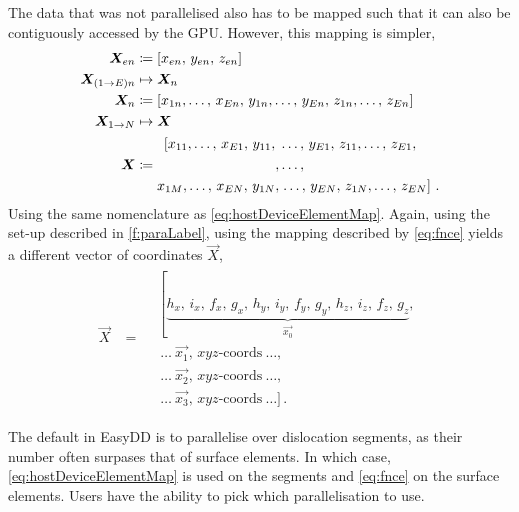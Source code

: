 The data that was not parallelised also has to be mapped such that it can also be contiguously accessed by the GPU. However, this mapping is simpler,
\begin{subequations}\label{eq:fnce}
  \begin{align}
    \vec{X}_{en}        & \coloneqq \left[x_{en},\, y_{en},\, z_{en}\right]                                                    \\
    \vec{X}_{(1\to E)n} & \mapsto \vec{X}_{n} \nn
    \vec{X}_{n}         & \coloneqq \left[x_{1n},\ldots,\, x_{En},\, y_{1n},\ldots,\, y_{En},\, z_{1n},\ldots,\, z_{En}\right] \\
    \vec{X}_{1\to N}    & \mapsto \vec{X}\nn
    \vec{X}             & \coloneqq
    \begin{aligned}
      \left[x_{11},\ldots,\, x_{E1},\, y_{11},\right. & \ldots,\, y_{E1},\, z_{11},\ldots,\, z_{E1},                \\
      ,                                               & \ldots,                                                     \\
      x_{1M},\ldots,\, x_{EN},\, y_{1N},              & \left.\ldots,\, y_{EN},\, z_{1N},\ldots,\, z_{EN}\right]\,.
    \end{aligned}
  \end{align}
\end{subequations}
Using the same nomenclature as \cref{eq:hostDeviceElementMap}. Again, using the set-up described in \cref{f:paraLabel}, using the mapping described by \cref{eq:fnce} yields a different vector of coordinates $\vec{X}$,
\begin{align}\label{eq:fnce_eg}
  \vec{X} & = \begin{aligned}
     & \left[\underbrace{h_{x},\, i_{x},\, f_{x},\, g_{x},\,
      h_{y},\, i_{y},\, f_{y},\, g_{y},\,
    h_{z},\, i_{z},\, f_{z},\, g_{z}}_{\vec{x_{0}}}\right.,  \\
     & ~\ldots~\vec{x_{1}},\, xyz\textrm{-coords}~\ldots,    \\
     & ~\ldots~\vec{x_{2}},\, xyz\textrm{-coords}~\ldots,    \\
     & ~\ldots~\vec{x_{3}},\, xyz\textrm{-coords}~\ldots]\,.
  \end{aligned}
\end{align}

The default in EasyDD is to parallelise over dislocation segments, as their number often surpases that of surface elements. In which case, \cref{eq:hostDeviceElementMap} is used on the segments and \cref{eq:fnce} on the surface elements. Users have the ability to pick which parallelisation to use.

